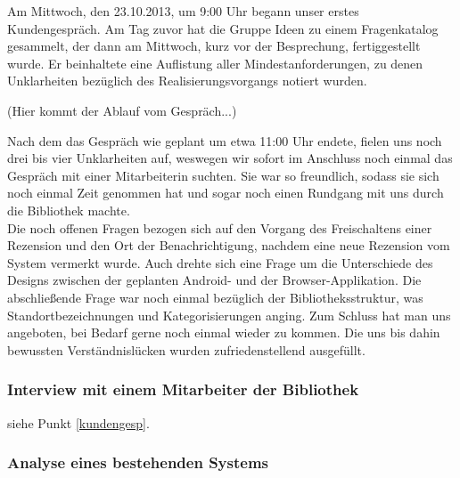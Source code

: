 \documentclass[fontsize=12pt,paper=a4,twoside]{scrartcl}
\begin{document}
Am Mittwoch, den 23.10.2013, um 9:00 Uhr begann unser erstes Kundengespräch.
Am Tag zuvor hat die Gruppe Ideen zu einem Fragenkatalog gesammelt, der dann
am Mittwoch, kurz vor der Besprechung, fertiggestellt wurde. Er beinhaltete
eine Auflistung aller Mindestanforderungen, zu denen Unklarheiten bezüglich 
des Realisierungsvorgangs notiert wurden. 

(Hier kommt der Ablauf vom Gespräch...)

Nach dem das Gespräch wie geplant um etwa 11:00 Uhr endete, fielen uns noch 
drei bis vier Unklarheiten auf, weswegen wir sofort im Anschluss noch einmal das Gespräch mit einer Mitarbeiterin suchten. Sie war so freundlich, sodass sie sich noch einmal Zeit genommen hat und sogar noch einen Rundgang mit uns durch die Bibliothek machte. \\
Die noch offenen Fragen bezogen sich auf den Vorgang des Freischaltens einer Rezension
und den Ort der Benachrichtigung, nachdem eine neue Rezension vom System vermerkt
wurde. Auch drehte sich eine Frage um die Unterschiede des Designs zwischen
der geplanten Android- und der Browser-Applikation. Die abschließende Frage war noch einmal bezüglich der Bibliotheksstruktur, was Standortbezeichnungen und
Kategorisierungen anging. Zum Schluss hat man uns angeboten, bei Bedarf gerne 
noch einmal wieder zu kommen. Die uns bis dahin bewussten Verständnislücken
wurden zufriedenstellend ausgefüllt. 

\subsubsection{Interview mit einem Mitarbeiter der Bibliothek}

siehe Punkt \ref{kundengesp}.

\subsubsection{Analyse eines bestehenden Systems}
\end{document}
